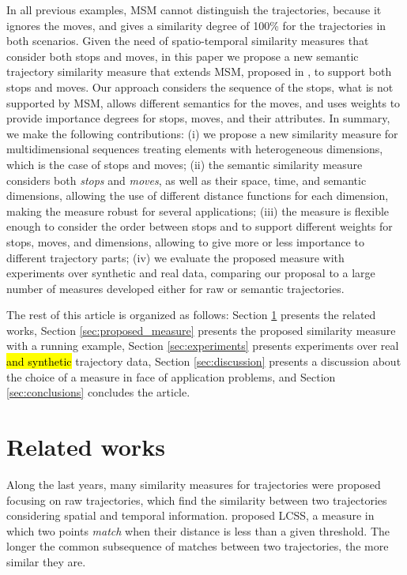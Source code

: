 \documentclass[12pt]{article}
\begin{document}
In all previous examples, MSM cannot distinguish the trajectories, because it ignores the moves, and gives a similarity degree of 100\% for the trajectories in both scenarios.
Given the need of spatio-temporal similarity measures that consider both stops and moves, in this paper we propose a new semantic trajectory similarity measure that extends MSM, proposed in \cite{Furtado:TGIS12156}, to support both stops and moves. Our approach considers the sequence of the stops, what is not supported by MSM, allows different semantics for the moves, and uses weights to provide importance degrees for stops, moves, and their attributes. 
In summary, we make the following contributions:
(i) we propose a new similarity measure for multidimensional sequences treating elements with heterogeneous dimensions, which is the case of stops and moves; (ii) the semantic similarity measure considers both \textit{stops} and \textit{moves}, as well as their space, time, and semantic dimensions, allowing the use of different distance functions for each dimension, making the measure robust for several applications; (iii) the measure is flexible enough to consider the order between stops and to support different weights for stops, moves, and dimensions, allowing to give more or less importance to different trajectory parts; (iv) we evaluate the proposed measure with experiments over synthetic and real data, comparing our proposal to a large number of measures developed either for raw or semantic trajectories.

The rest of this article is organized as follows: Section \ref{sec:related} presents the related works, Section \ref{sec:proposed_measure} presents the proposed similarity measure with a running example, Section \ref{sec:experiments} presents experiments over real \hl{and synthetic} trajectory data, Section \ref{sec:discussion} presents a discussion about the choice of a measure in face of application problems, and Section \ref{sec:conclusions} concludes the article.


\section{Related works} \label{sec:related}
Along the last years, many similarity measures for trajectories were proposed focusing on raw trajectories, which find the similarity between two trajectories considering spatial and temporal information. \cite{vlachos2002discovering} proposed LCSS, a measure in which two points \textit{match} when their distance is less than a given threshold. The longer the common subsequence of matches between two trajectories, the more similar they are.
\end{document}
